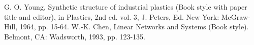 \documentclass[a4paper, 10pt, conference]{ieeeconf}      %
\begin{document}




\begin{thebibliography}{99}

 G. O. Young, Synthetic structure of industrial plastics (Book style with paper title and editor), 	in Plastics, 2nd ed. vol. 3, J. Peters, Ed.  New York: McGraw-Hill, 1964, pp. 15-64.
 W.-K. Chen, Linear Networks and Systems (Book style).	Belmont, CA: Wadsworth, 1993, pp. 123-135.


\end{thebibliography}
\end{document}
